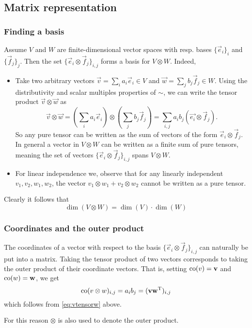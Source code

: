 \subsection{Matrix representation}
\subsubsection{Finding a basis}
Assume $V$ and $W$ are finite-dimensional vector spaces with resp. bases $\{\vec{e}_i\}_i$ and $\{\vec{f}_j\}_j$. Then the set $\{ \vec{e}_i\otimes \vec{f}_j \}_{i,j}$ forms a basis for $V\otimes W$. Indeed,
\begin{itemize}
\item Take two arbitrary vectors $\vec{v} = \sum_i a_i \vec{e}_i \in V$ and $\vec{w} = \sum_j b_j \vec{f}_j \in W$.
Using the distributivity and scalar multiples properties of $\sim$, we can write the tensor product $\vec{v}\otimes \vec{w}$ as
\begin{equation} \vec{v}\otimes \vec{w} = (\sum_i a_i \vec{e}_i)\otimes(\sum_j b_j \vec{f}_j) = \sum_{i,j}a_ib_j (\vec{e_i}\otimes \vec{f}_j). \label{eq:vtensorw} \end{equation}
So any pure tensor can be written as the sum of vectors of the form $\vec{e}_i\otimes \vec{f}_j$. In general a vector in $V\otimes W$ can be written as a finite sum of pure tensors, meaning the set of vectors $\{ \vec{e}_i\otimes \vec{f}_j \}_{i,j}$ spans $V\otimes W$.
\item For linear independence we, observe that for any linearly independent $v_1, v_2, w_1, w_2$, the vector $v_1\otimes w_1 + v_2\otimes w_2$ cannot be written as a pure tensor.
\end{itemize}

Clearly it follows that
\[ \dim(V\otimes W) = \dim(V)\cdot\dim(W) \]

\subsubsection{Coordinates and the outer product}
The coordinates of a vector with respect to the basis $\{ \vec{e}_i\otimes \vec{f}_j \}_{i,j}$ can naturally be put into a matrix. Taking the tensor product of two vectors corresponds to taking the outer product of their coordinate vectors. That is, setting $\operatorname{co}(v) = \boldsymbol{\mathrm{v}}$ and $\operatorname{co}(w) = \boldsymbol{\mathrm{w}}$, we get
\[ \operatorname{co}(v\otimes w)_{i,j} = a_ib_j = (\boldsymbol{\mathrm{v}}\boldsymbol{\mathrm{w}}^{\mathrm{T}})_{i,j} \]
which follows from \eqref{eq:vtensorw} above.

For this reason $\otimes$ is also used to denote the outer product.

